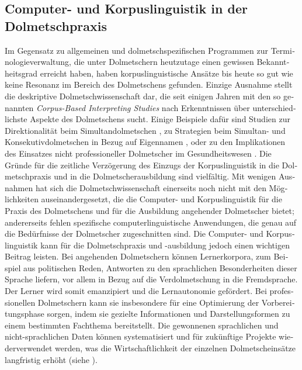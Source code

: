 \documentclass[output=paper]{LSP/langsci}
\begin{document}
\begin{otherlanguage}{ngerman}
\section{Computer- und Korpuslinguistik in der Dolmetschpraxis}\label{sec:fantinuoli:5}

Im Gegensatz zu allgemeinen und dolmetschspezifischen Programmen zur Terminologieverwaltung, die unter Dolmetschern heutzutage einen gewissen Bekanntheitsgrad erreicht haben, haben korpuslinguistische Ansätze bis heute so gut wie keine Resonanz im Bereich des Dolmetschens gefunden. Einzige Ausnahme stellt die deskriptive Dolmetschwissenschaft dar, die seit einigen Jahren mit den so genannten \textit{Corpus-Based Interpreting Studies} nach Erkenntnissen über unterschiedlichste Aspekte des Dolmetschens sucht. Einige Beispiele dafür sind Studien zur Direktionalität beim Simultandolmetschen \citep{Bendazzoli2005}, zu Strategien beim Simultan- und Konsekutivdolmetschen in Bezug auf Eigennamen \citep{Meyer2008}, oder zu den Implikationen des Einsatzes nicht professioneller Dolmetscher im Gesundheitswesen \citep{MeyerEtAl2010}. Die Gründe für die zeitliche Verzögerung des Einzugs der Korpuslinguistik in die Dolmetschpraxis und in die Dolmetscherausbildung sind vielfältig. Mit wenigen Ausnahmen 
\citep{Fantinuoli2006,Gorjanc2009} hat sich die Dolmetschwissenschaft einerseits noch nicht mit den Möglichkeiten auseinandergesetzt, die die Computer- und Korpuslinguistik für die Praxis des Dolmetschens und für die Ausbildung angehender Dolmetscher bietet; andererseits fehlen spezifische computerlinguistische Anwendungen, die genau auf die Bedürfnisse der Dolmetscher zugeschnitten sind. Die Computer- und Korpuslinguistik kann für die Dolmetschpraxis und -ausbildung jedoch einen wichtigen Beitrag leisten. Bei angehenden Dolmetschern können Lernerkorpora, zum Beispiel aus politischen Reden, Antworten zu den sprachlichen Besonderheiten dieser Sprache liefern, vor allem in Bezug auf die Verdolmetschung in die Fremdsprache. Der Lerner wird somit emanzipiert und die Lernautonomie gefördert. Bei professionellen Dolmetschern kann sie insbesondere für eine Optimierung der Vorbereitungsphase sorgen, indem sie gezielte Informationen und Darstellungsformen zu einem bestimmten Fachthema bereitstellt. Die gewonnenen sprachlichen und nicht-sprachlichen Daten können systematisiert und für zukünftige Projekte wiederverwendet werden, was die Wirtschaftlichkeit der einzelnen Dolmetscheinsätze langfristig erhöht (siehe ). 


\end{otherlanguage}
\end{document}
